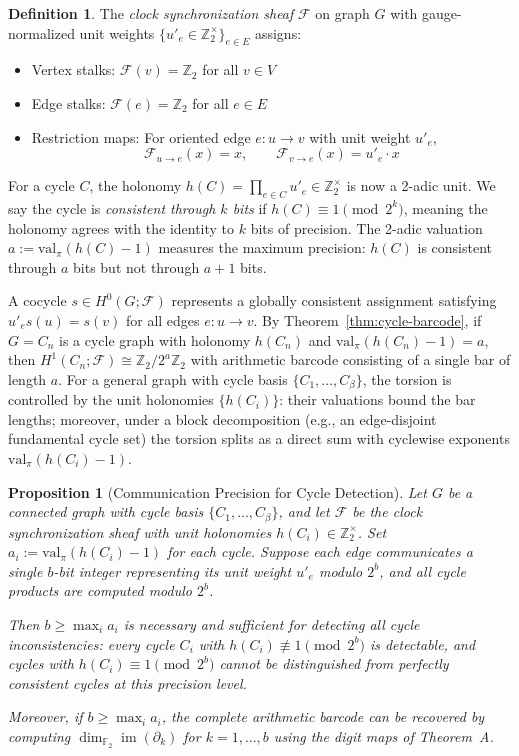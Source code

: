 \documentclass[11pt]{amsart}
\theoremstyle{plain}
\newtheorem{proposition}[theorem]{Proposition}
\theoremstyle{definition}
\newtheorem{definition}[theorem]{Definition}
\newcommand{\valpi}{\mathrm{val}_{\unif}}                   %
\newcommand{\unif}{\pi}                        %
\newcommand{\sheaf}[1]{\mathcal{#1}}                  %
\newcommand{\stalk}[2]{#1(#2)}                        %
\newcommand{\face}{\to}                               %
\newcommand{\res}[3]{#1_{#2 \face #3}}                  %
\newcommand{\Digit}[1]{\partial_{#1}}%
\DeclareMathOperator{\im}{im}                         %
\begin{document}
\begin{definition}
\label{def:clock-sheaf}
The \emph{clock synchronization sheaf} $\sheaf{F}$ on graph $G$ with gauge-normalized unit weights $\{u'_e \in \mathbb{Z}_2^\times\}_{e \in E}$ assigns:
\begin{itemize}
\item Vertex stalks: $\stalk{\sheaf{F}}{v} = \mathbb{Z}_2$ for all $v \in V$
\item Edge stalks: $\stalk{\sheaf{F}}{e} = \mathbb{Z}_2$ for all $e \in E$  
\item Restriction maps: For oriented edge $e: u \to v$ with unit weight $u'_e$,
\[
\res{\sheaf{F}}{u}{e}(x) = x, \qquad \res{\sheaf{F}}{v}{e}(x) = u'_e \cdot x
\]
\end{itemize}
\end{definition}

For a cycle $C$, the holonomy $h(C) = \prod_{e \in C} u'_e \in \mathbb{Z}_2^\times$ is now a 2-adic unit. We say the cycle is \emph{consistent through $k$ bits} if $h(C) \equiv 1 \pmod{2^k}$, meaning the holonomy agrees with the identity to $k$ bits of precision. The 2-adic valuation $a := \valpi(h(C) - 1)$ measures the maximum precision: $h(C)$ is consistent through $a$ bits but not through $a+1$ bits.

A cocycle $s \in H^0(G;\sheaf{F})$ represents a globally consistent assignment satisfying $u'_e s(u) = s(v)$ for all edges $e: u \to v$. By Theorem~\ref{thm:cycle-barcode}, if $G = C_n$ is a cycle graph with holonomy $h(C_n)$ and $\valpi(h(C_n)-1) = a$, then $H^1(C_n;\sheaf{F}) \cong \mathbb{Z}_2/2^a\mathbb{Z}_2$ with arithmetic barcode consisting of a single bar of length $a$. For a general graph with cycle basis $\{C_1, \ldots, C_\beta\}$, the torsion is controlled by the unit holonomies $\{h(C_i)\}$: their valuations bound the bar lengths; moreover, under a block decomposition (e.g., an edge-disjoint fundamental cycle set) the torsion splits as a direct sum with cyclewise exponents $\valpi(h(C_i)-1)$.

\begin{proposition}[Communication Precision for Cycle Detection]
\label{prop:scalar-precision}
Let $G$ be a connected graph with cycle basis $\{C_1, \ldots, C_\beta\}$, and let $\sheaf{F}$ be the clock synchronization sheaf with unit holonomies $h(C_i) \in \mathbb{Z}_2^\times$. Set $a_i := \valpi(h(C_i) - 1)$ for each cycle. Suppose each edge communicates a single $b$-bit integer representing its unit weight $u'_e$ modulo $2^b$, and all cycle products are computed modulo $2^b$.

Then $b \geq \max_i a_i$ is necessary and sufficient for detecting all cycle inconsistencies: every cycle $C_i$ with $h(C_i) \not\equiv 1 \pmod{2^b}$ is detectable, and cycles with $h(C_i) \equiv 1 \pmod{2^b}$ cannot be distinguished from perfectly consistent cycles at this precision level.

Moreover, if $b \geq \max_i a_i$, the complete arithmetic barcode can be recovered by computing $\dim_{\mathbb{F}_2} \im(\Digit{k})$ for $k = 1, \ldots, b$ using the digit maps of Theorem~A.
\end{proposition}
\end{document}
